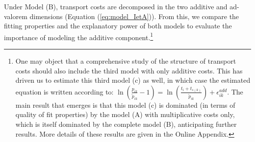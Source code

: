 \documentclass[a4paper,11pt]{article}
\begin{document}
Under Model (B), transport costs are decomposed in the two additive and ad-valorem dimensions (Equation (\ref{eq:model_IetA})).
From this, we compare the fitting properties and the explanatory power of both models to evaluate the importance of modeling the additive component.\footnote{One may object that a comprehensive study of the structure of transport costs should also include the third model with only additive costs. This has driven us to estimate this third model (c) as well, in which case the estimated equation is written according to: $\ln\left(\frac{p_{ik}}{\widetilde{p}_{ik}}-1 \right)= \ln \left(\frac{t_{i} + t_{s(k)}}{\widetilde{p}_{ik}}\right) + \epsilon^{add}_{ik}$.
The main result that emerges is that this model (c) is dominated (in terms of quality of fit properties) by the model (A) with multiplicative costs only, which is itself dominated by the complete model (B), anticipating further results. More details of these results are given in the Online Appendix.}




\end{document}
